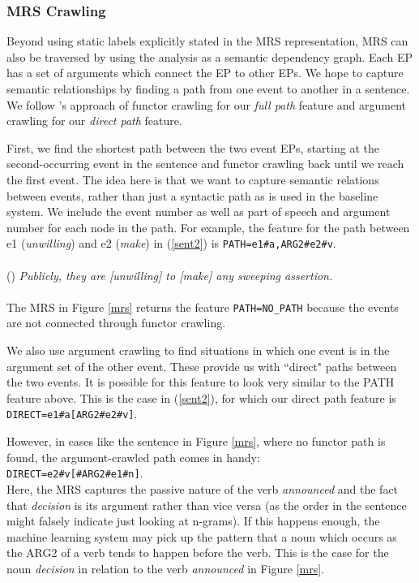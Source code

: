 \documentclass[11pt]{article}
\begin{document}
\subsubsection{MRS Crawling}

Beyond using static labels explicitly stated in the MRS representation, MRS can also be traversed by using the analysis as a semantic dependency graph. Each EP has a set of arguments which connect the EP to other EPs. We hope to capture semantic relationships by finding a path from one event to another in a sentence. We follow 's approach of functor crawling for our \emph{full path} feature and argument crawling for our \emph{direct path} feature.

First, we find the shortest path between the two event EPs, starting at the second-occurring event in the sentence and functor crawling back until we reach the first event. The idea here is that we want to capture semantic relations between events, rather than just a syntactic path as is used in the baseline system. We include the event number as well as part of speech and argument number for each node in the path. For example, the feature for the path between e1 (\emph{unwilling}) and e2 (\emph{make}) in (\ref{sent2}) is \texttt{PATH=e1\#a,ARG2\#e2\#v}.\\\\
(\exampleno)\label{sent2} \emph{Publicly, they are [unwilling] to [make] any sweeping assertion.}\\\\
The MRS in Figure \ref{mrs} returns the feature \texttt{PATH=NO\_PATH} because the events are not connected through functor crawling.

We also use argument crawling to find situations in which one event is in the argument set of the other event. These provide us with ``direct" paths between the two events. It is possible for this feature to look very similar to the PATH feature above. This is the case in (\ref{sent2}), for which our direct path feature is \texttt{DIRECT=e1\#a[ARG2\#e2\#v]}.

However, in cases like the sentence in Figure \ref{mrs}, where no functor path is found, the argument-crawled path comes in handy:\\

\texttt{DIRECT=e2\#v[\#ARG2\#e1\#n]}.\\

Here, the MRS captures the passive nature of the verb \emph{announced} and the fact that \emph{decision} is its argument rather than vice versa (as the order in the sentence might falsely indicate just looking at n-grams). If this happens enough, the machine learning system may pick up the pattern that a noun which occurs as the ARG2 of a verb tends to happen before the verb. This is the case for the noun \emph{decision} in relation to the verb \emph{announced} in Figure \ref{mrs}.
\end{document}
